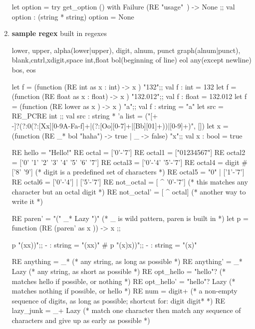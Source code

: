 \begin{enumerate}
\begin{alternate}
let option = try get_option () with Failure (RE "usage"~) -> None ;;
val option : (string * string) option = None  
\end{alternate}


\item \textbf{sample regex}
  built in regexes
  \begin{bluetext}
    lower, upper, alpha(lower|upper), digit, alnum, punct
    graph(alnum|punct), blank,cntrl,xdigit,space
    int,float
    bol(beginning of line)
    eol
    any(except newline)
    bos, eos
  \end{bluetext}
  \begin{alternate}
let f = (function (RE int as x : int) -> x ) "132";;
val f : int = 132
let f = (function (RE float as x : float) -> x ) "132.012";;
val f : float = 132.012
let f = (function (RE lower as x ) -> x ) "a";;
val f : string = "a"
let src = RE_PCRE int ;;
val src : string * 'a list = ("[+\\-]?(?:0(?:[Xx][0-9A-Fa-f]+|(?:[Oo][0-7]+|[Bb][01]+))|[0-9]+)", [])
let x = (function (RE _* bol "haha") -> true | _ -> false) "x\nhaha";;
val x : bool = true
\end{alternate}

\begin{ocamlcode}
RE hello = "Hello!" 
RE octal  = ['0'-'7']
RE octal1 = ["01234567"]
RE octal2 = ['0' '1' '2' '3' '4' '5' '6' '7']
RE octal3 = ['0'-'4' '5'-'7']
RE octal4 = digit # ['8' '9']  (* digit is a predefined set of characters *)
RE octal5 = "0" | ['1'-'7']
RE octal6 = ['0'-'4'] | ['5'-'7']
RE not_octal = [ ^ '0'-'7'] (* this matches any character but an octal digit *)
RE not_octal' = [ ^ octal]  (* another way to write it *)
\end{ocamlcode}

\begin{ocamlcode}
RE paren' = "(" _* Lazy ")"
(* _ is wild pattern, paren is built in *)
let p = function (RE (paren' as x )) -> x ;;
\end{ocamlcode}

\begin{alternate}
p "(xx))";;
- : string = "(xx)"
# p "(x)x))";;
- : string = "(x)"
\end{alternate}

\begin{ocamlcode}
RE anything  = _*         (* any string, as long as possible *)
RE anything' = _* Lazy    (* any string, as short as possible *)
RE opt_hello  = "hello"?      (* matches hello if possible, or nothing *)
RE opt_hello' = "hello"? Lazy (* matches nothing if possible, or hello *)
RE num = digit+        (* a non-empty sequence of digits, as long as possible;
                          shortcut for: digit digit* *)
RE lazy_junk = _+ Lazy (* match one character then match any sequence
                          of characters and give up as early as possible *)


\end{ocamlcode}
\end{enumerate}
